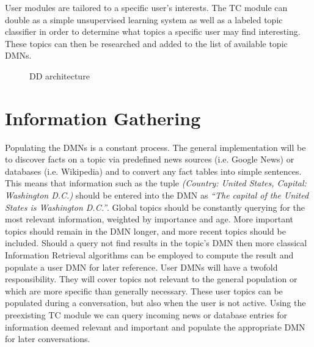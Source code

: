 \documentclass[12pt]{article}
\begin{document}
\noindent
User modules are tailored to a specific user's interests. The TC module can double as a simple unsupervised learning system as well as a labeled topic classifier in order to determine what topics a specific user may find interesting. These topics can then be researched and added to the list of available topic DMNs.

\begin{figure}
    \centering
    \label{DD_design}
    \caption{DD architecture}
\end{figure}

\section{Information Gathering \label{section_info}}
Populating the DMNs is a constant process. The general implementation will be to discover facts on a topic via predefined news sources (i.e. Google News) or databases (i.e. Wikipedia) and to convert any fact tables into simple sentences. This means that information such as the tuple \emph{(Country: United States, Capital: Washington D.C.)} should be entered into the DMN as \emph{``The capital of the United States is Washington D.C.''}. Global topics should be constantly querying for the most relevant information, weighted by importance and age. More important topics should remain in the DMN longer, and more recent topics should be included. Should a query not find results in the topic's DMN then more classical Information Retrieval algorithms can be employed to compute the result and populate a user DMN for later reference. User DMNs will have a twofold responsibility. They will cover topics not relevant to the general population or which are more specific than generally necessary.
These user topics can be populated during a conversation, but also when the user is not active. Using the preexisting TC module we can query incoming news or database entries for information deemed relevant and important and populate the appropriate DMN for later conversations. 


 
\end{document}
